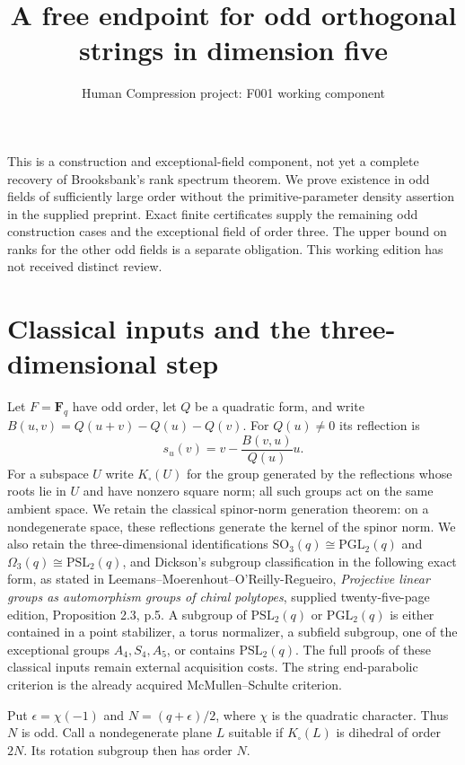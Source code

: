 \documentclass[11pt,a4paper]{article}
\title{A free endpoint for odd orthogonal strings in dimension five}
\author{Human Compression project: F001 working component}
\date{}
\newcommand{\F}{\mathbf F}
\newcommand{\Om}{\Omega}
\begin{document}
\maketitle
This is a construction and exceptional-field component, not yet a complete recovery of
Brooksbank's rank spectrum theorem. We prove existence in odd fields
of sufficiently large order without the primitive-parameter density
assertion in the supplied preprint. Exact finite certificates supply
the remaining odd construction cases and the exceptional field
of order three. The upper bound on ranks for the other odd fields
is a separate obligation. This working edition has not received
distinct review.

\section{Classical inputs and the three-dimensional step}
Let $F=\F_q$ have odd order, let $Q$ be a quadratic form, and write
$B(u,v)=Q(u+v)-Q(u)-Q(v)$. For $Q(u)\ne0$ its reflection is
\[
 s_u(v)=v-\frac{B(v,u)}{Q(u)}u.
\]
For a subspace $U$ write $K_\square(U)$ for the group generated by
the reflections whose roots lie in $U$ and have nonzero square norm;
all such groups act on the same ambient space. We retain the
classical spinor-norm generation theorem: on a nondegenerate
space, these reflections generate the kernel of the spinor norm.
We also retain the three-dimensional identifications
$\mathrm{SO}_3(q)\cong\mathrm{PGL}_2(q)$ and
$\Om_3(q)\cong\mathrm{PSL}_2(q)$, and Dickson's subgroup
classification in the following exact form, as stated in
Leemans--Moerenhout--O'Reilly-Regueiro, \emph{Projective linear
groups as automorphism groups of chiral polytopes}, supplied
twenty-five-page edition, Proposition 2.3, p.5. A subgroup of
$\mathrm{PSL}_2(q)$ or $\mathrm{PGL}_2(q)$ is either contained
in a point stabilizer, a torus normalizer, a subfield subgroup,
one of the exceptional groups $A_4,S_4,A_5$, or contains
$\mathrm{PSL}_2(q)$. The full proofs of these classical inputs
remain external acquisition costs. The string end-parabolic
criterion is the already acquired McMullen--Schulte criterion.

Put $\epsilon=\chi(-1)$ and $N=(q+\epsilon)/2$, where $\chi$
is the quadratic character. Thus $N$ is odd. Call a nondegenerate
plane $L$ suitable if $K_\square(L)$ is dihedral of order $2N$.
Its rotation subgroup then has order $N$.
\end{document}
